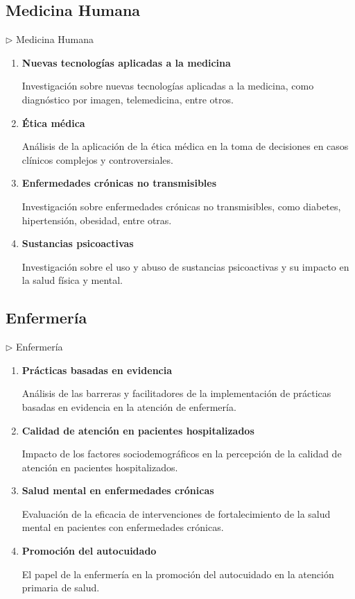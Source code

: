 \documentclass[12pt,a4paper]{article}
\begin{document}
\subsection{Medicina Humana}

\begin{careerbox}{$\triangleright$ Medicina Humana}
	\begin{enumerate}
		\item \textbf{Nuevas tecnologías aplicadas a la medicina}
		
		Investigación sobre nuevas tecnologías aplicadas a la medicina, como diagnóstico por imagen, telemedicina, entre otros.
		
		\item \textbf{Ética médica}
		
		Análisis de la aplicación de la ética médica en la toma de decisiones en casos clínicos complejos y controversiales.
		
		\item \textbf{Enfermedades crónicas no transmisibles}
		
		Investigación sobre enfermedades crónicas no transmisibles, como diabetes, hipertensión, obesidad, entre otras.
		
		\item \textbf{Sustancias psicoactivas}
		
		Investigación sobre el uso y abuso de sustancias psicoactivas y su impacto en la salud física y mental.
	\end{enumerate}
\end{careerbox}

\subsection{Enfermería}

\begin{careerbox}{$\triangleright$ Enfermería}
	\begin{enumerate}
		\item \textbf{Prácticas basadas en evidencia}
		
		Análisis de las barreras y facilitadores de la implementación de prácticas basadas en evidencia en la atención de enfermería.
		
		\item \textbf{Calidad de atención en pacientes hospitalizados}
		
		Impacto de los factores sociodemográficos en la percepción de la calidad de atención en pacientes hospitalizados.
		
		\item \textbf{Salud mental en enfermedades crónicas}
		
		Evaluación de la eficacia de intervenciones de fortalecimiento de la salud mental en pacientes con enfermedades crónicas.
		
		\item \textbf{Promoción del autocuidado}
		
		El papel de la enfermería en la promoción del autocuidado en la atención primaria de salud.
	\end{enumerate}
\end{careerbox}
\end{document}
